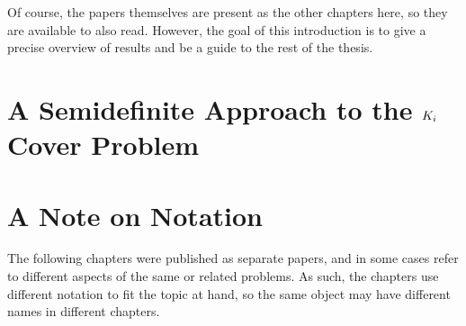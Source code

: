 Of course, the papers themselves are present as the other chapters here, so
they are available to also read. However, the goal of this introduction
is to give a precise overview of results and be a guide to the rest of the
thesis.

\section{A Semidefinite Approach to the $K_\MakeLowercase{i}$ Cover Problem}

\section{A Note on Notation}
The following chapters were published as separate papers, and in some cases
refer to different aspects of the same or related problems. As such, the 
chapters use different notation to fit the topic at hand, so the same object
may have different names in different chapters.
